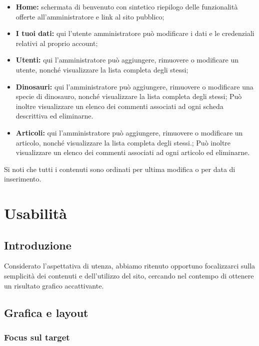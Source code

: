 \documentclass[12pt]{article}
\begin{document}
	\begin{itemize}
		\item \textbf{Home:} schermata di benvenuto con sintetico riepilogo delle funzionalità offerte all'amministratore e link al sito pubblico;
		
		\item \textbf{I tuoi dati:} qui l'utente amministratore può modificare i dati e le credenziali relativi al proprio account;
		
		\item \textbf{Utenti:} qui l'amministratore può aggiungere, rimuovere o modificare un utente, nonché visualizzare la lista completa degli stessi;
		
		\item \textbf{Dinosauri:} qui l'amministratore può aggiungere, rimuovere o modificare una specie di dinosauro, nonché visualizzare la lista completa degli stessi; Può inoltre visualizzare un elenco dei commenti associati ad ogni scheda descrittiva ed eliminarne.
		
		\item \textbf{Articoli:} qui l'amministratore può aggiungere, rimuovere o modificare un articolo, nonché visualizzare la lista completa degli stessi.; Può inoltre visualizzare un elenco dei commenti associati ad ogni articolo ed eliminarne.
	\end{itemize}
	Si noti che tutti i contenuti sono ordinati per ultima modifica o per data di inserimento.
		
	\newpage
	\section{Usabilità}
	
	\subsection{Introduzione}
	
	Considerato l'aspettativa di utenza, abbiamo ritenuto opportuno focalizzarci sulla semplicità dei contenuti e dell'utilizzo del sito, cercando nel contempo di ottenere un risultato grafico accattivante.
	
	\subsection{Grafica e layout}
	
		\subsubsection{Focus sul target}
		
\end{document}
